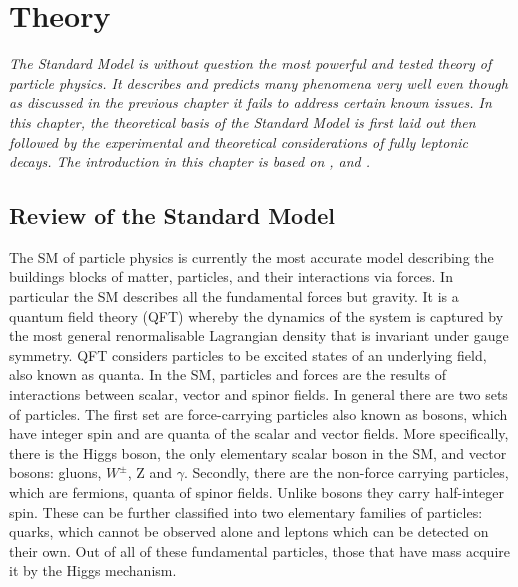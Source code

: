 \chapter{Theory}
\label{stheory}
\textit{The Standard Model is without question the most powerful and tested theory of particle physics. It describes and predicts many phenomena very well even though as discussed in the previous chapter it fails to address certain known issues. In this chapter, the theoretical basis of the Standard Model is first laid out \DIFdelbegin {}\DIFdelend \DIFaddbegin {}\DIFaddend then followed by the experimental and theoretical considerations of fully leptonic decays. The introduction in this chapter is based on \DIFdelbegin {}\DIFdelend \DIFaddbegin {}\DIFaddend \cite{Griffiths:111880},\cite{Novaes:1999yn} and \cite{Pich:2012sx}.}



\section{Review of the Standard Model}
The \gls{SM} of particle physics \DIFaddbegin {}\DIFaddend is currently the most accurate model describing the buildings blocks of matter, particles, and their interactions via forces. In particular the \gls{SM} describes all the fundamental forces but gravity. It is a quantum field theory (\gls{QFT}) whereby the dynamics of the system is captured by the most general renormalisable Lagrangian density that is invariant under gauge symmetry. \gls{QFT} considers particles to be excited states of an underlying field, also known as quanta. In the \gls{SM}, particles and forces are the results of interactions between scalar, vector and spinor fields. In general there are two sets of particles. The first set are force-carrying particles also known as bosons, which have integer spin and are quanta of the scalar and vector fields. More specifically, there is the Higgs boson, the only elementary scalar boson in the \gls{SM}, and vector bosons: gluons, $W^{\pm}$, Z and $\gamma$. Secondly, there are the non-force carrying particles, which are fermions, quanta of spinor fields. Unlike bosons they carry half-integer spin. These can be further classified into two elementary families of particles: quarks, which cannot be observed alone and leptons which can be detected on their own. Out of all of these fundamental particles, those that have mass acquire it by the Higgs mechanism.

